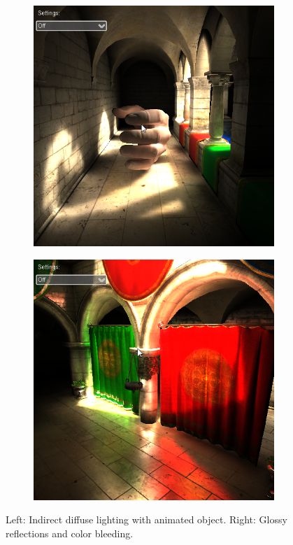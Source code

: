 \begin{figure}\label{f:vct-indirect}
\begin{center}
	\begin{subfigure}[b]{0.48\textwidth}
		\includegraphics{graphics/vct/vct-14-2}
	\end{subfigure}
	\begin{subfigure}[b]{0.48\textwidth}
		\includegraphics{graphics/vct/vct-14-3}
	\end{subfigure}
\end{center}
	\caption{Left: Indirect diffuse lighting with animated object. Right: Glossy reflections and color bleeding.}
\end{figure}




